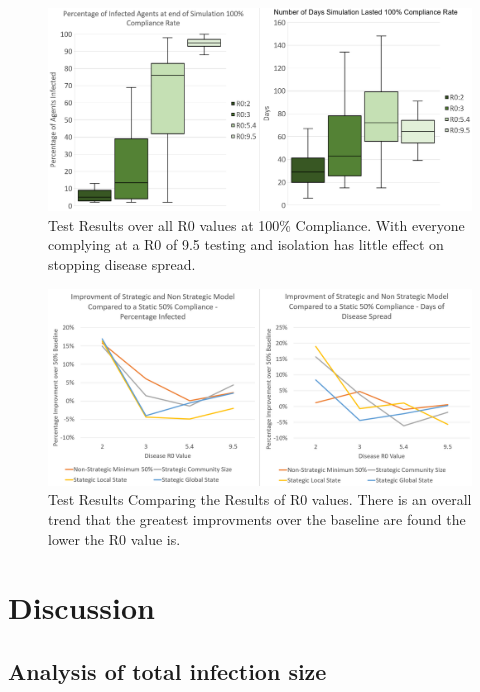 \documentclass{article}
\begin{document}
\begin{figure}[h!]
\centering
\includegraphics[width=\textwidth]{6}
\caption{Test Results over all R0 values at 100\% Compliance. With everyone complying at a R0 of 9.5 testing and isolation has little effect on stopping disease spread.}
\end{figure}

\begin{figure}[h!]
\centering
\includegraphics[width=\textwidth]{1}
\caption{Test Results Comparing the Results of R0 values. There is an overall trend that the greatest improvments over the baseline are found the lower the R0 value is.}
\end{figure}
\newpage


\section{Discussion}

\subsection{Analysis of total infection size}
\end{document}
